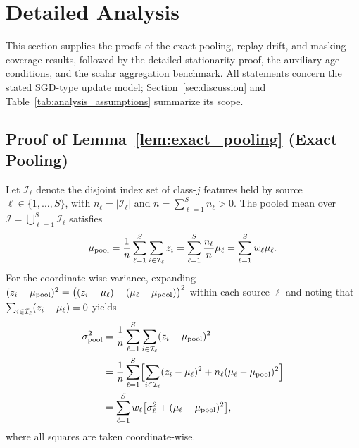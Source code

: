 \section{Detailed Analysis}
\label{supp:analysis}

This section supplies the proofs of the exact-pooling, replay-drift, and masking-coverage results, followed by the detailed stationarity proof, the auxiliary age conditions, and the scalar aggregation benchmark. All statements concern the stated SGD-type update model; Section~\ref{sec:discussion} and Table~\ref{tab:analysis_assumptions} summarize its scope.

\subsection{Proof of Lemma~\ref{lem:exact_pooling} (Exact Pooling)}
Let $\mathcal I_\ell$ denote the disjoint index set of class-$j$ features held by source $\ell \in \{1,\ldots,S\}$, with $n_\ell = |\mathcal I_\ell|$ and $n = \sum_{\ell=1}^S n_\ell > 0$. The pooled mean over $\mathcal I = \bigcup_{\ell=1}^S \mathcal I_\ell$ satisfies
\begin{equation}
 \mu_{\mathrm{pool}} = \frac{1}{n}\sum_{\ell=1}^S \sum_{i\in\mathcal I_\ell} z_i = \sum_{\ell=1}^S \frac{n_\ell}{n} \mu_\ell = \sum_{\ell=1}^S w_\ell \mu_\ell.
\end{equation}
For the coordinate-wise variance, expanding $(z_i - \mu_{\mathrm{pool}})^2 = \bigl((z_i - \mu_\ell) + (\mu_\ell - \mu_{\mathrm{pool}})\bigr)^2$ within each source $\ell$ and noting that $\sum_{i\in\mathcal I_\ell}(z_i - \mu_\ell) = 0$ yields
\begin{align}
 \sigma_{\mathrm{pool}}^2
 &= \frac{1}{n}\sum_{\ell=1}^S \sum_{i\in\mathcal I_\ell} (z_i - \mu_{\mathrm{pool}})^2 \nonumber\\
 &= \frac{1}{n}\sum_{\ell=1}^S \Bigl[ \sum_{i\in\mathcal I_\ell}(z_i - \mu_\ell)^2 + n_\ell(\mu_\ell - \mu_{\mathrm{pool}})^2 \Bigr] \nonumber\\
 &= \sum_{\ell=1}^S w_\ell \bigl[\sigma_\ell^2 + (\mu_\ell - \mu_{\mathrm{pool}})^2\bigr],
\end{align}
where all squares are taken coordinate-wise.

